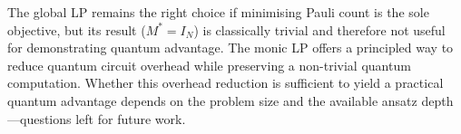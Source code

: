 \documentclass{article}
\begin{document}
The global LP remains the right choice if minimising Pauli count is the sole objective,
but its result ($M^* = I_N$) is classically trivial and therefore not useful for
demonstrating quantum advantage.  The monic LP offers a principled way to reduce
quantum circuit overhead while preserving a non-trivial quantum computation.  Whether
this overhead reduction is sufficient to yield a practical quantum advantage depends
on the problem size and the available ansatz depth---questions left for future work.
\end{document}
